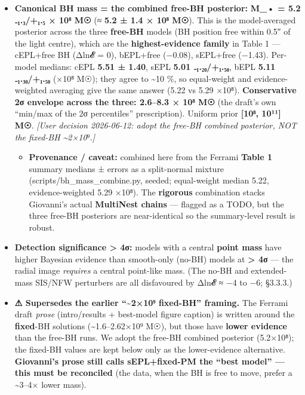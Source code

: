 \documentclass[
]{article}
\providecommand{\tightlist}{%
  \setlength{\itemsep}{0pt}\setlength{\parskip}{0pt}}
\newcommand{\BreakablePath}[1]{{\ttfamily\sloppy #1}}
\begin{document}
\begin{itemize}
\tightlist
\item
  \textbf{Canonical BH mass = the combined free-BH posterior:}
  \textbf{M\_• = 5.2 ₋₁.₃/+₁.₅ × 10⁸ M☉} (≈ \textbf{5.2 ± 1.4 × 10⁸
  M☉}). This is the model-averaged posterior across the three
  \textbf{free-BH} models (BH position free within 0.5″ of the light
  centre), which are the \textbf{highest-evidence family} in Table 1 ---
  cEPL+free BH (Δln𝓔 = 0), bEPL+free (−0.08), sEPL+free (−1.43).
  Per-model medians: cEPL \textbf{5.51 ± 1.40}, sEPL \textbf{5.01
  ₋₁.₂₀/+₁.₅₀}, bEPL \textbf{5.11 ₋₁.₃₀/+₁.₅₀} (×10⁸ M☉); they agree to
  \textasciitilde10 \%, so equal-weight and evidence-weighted averaging
  give the same answer (5.22 vs 5.29 ×10⁸). \textbf{Conservative 2σ
  envelope across the three: 2.6--8.3 × 10⁸ M☉} (the draft's own
  ``min/max of the 2σ percentiles'' prescription). Uniform prior
  \textbf{{[}10⁸, 10¹¹{]} M☉}. \emph{{[}User decision 2026-06-12: adopt
  the free-BH combined posterior, NOT the fixed-BH
  \textasciitilde2×10⁹.{]}}

  \begin{itemize}
  \tightlist
  \item
    \textbf{Provenance / caveat:} combined here from the Ferrami
    \textbf{Table 1} summary medians ± errors as a split-normal mixture
    (\BreakablePath{scripts/\discretionary{}{}{}bh\_\discretionary{}{}{}mass\_\discretionary{}{}{}combine.\discretionary{}{}{}py},
    seeded; equal-weight median 5.22, evidence-weighted 5.29 ×10⁸). The
    \textbf{rigorous} combination stacks Giovanni's actual
    \textbf{MultiNest chains} --- flagged as a TODO, but the three
    free-BH posteriors are near-identical so the summary-level result is
    robust.
  \end{itemize}
\item
  \textbf{Detection significance \textgreater{} 4σ:} models with a
  central \textbf{point mass} have higher Bayesian evidence than
  smooth-only (no-BH) models at \textbf{\textgreater{} 4σ} --- the
  radial image \emph{requires} a central point-like mass. (The no-BH and
  extended-mass SIS/NFW perturbers are all disfavoured by Δln𝓔 ≈ −4 to
  −6; §3.3.3.)
\item
  \textbf{⚠ Supersedes the earlier ``\textasciitilde2×10⁹ fixed-BH''
  framing.} The Ferrami draft \emph{prose} (intro/results + best-model
  figure caption) is written around the \textbf{fixed}-BH solutions
  (\textasciitilde1.6--2.62×10⁹ M☉), but those have \textbf{lower
  evidence} than the free-BH runs. We adopt the free-BH combined
  posterior (5.2×10⁸); the fixed-BH values are kept below only as the
  lower-evidence alternative. \textbf{Giovanni's prose still calls
  sEPL+fixed-PM the ``best model'' --- this must be reconciled} (the
  data, when the BH is free to move, prefer a \textasciitilde3--4× lower
  mass).
\end{itemize}
\end{document}
